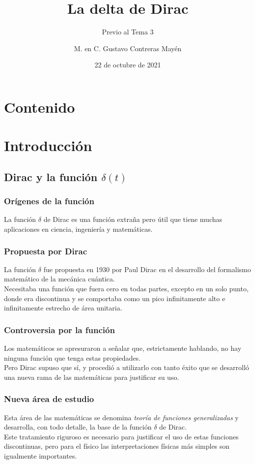 \documentclass[12pt]{beamer}
\date{22 de octubre de 2021}
\title{\large{La delta de Dirac}}
\subtitle{Previo al Tema 3}
\author{M. en C. Gustavo Contreras Mayén}
\begin{document}
\maketitle
\fontsize{14}{14}\selectfont
{}

\section*{Contenido}

\section{Introducción}
\subsection{Dirac y la función \texorpdfstring{$\delta(t)$}{d(t)}}

\begin{frame}
    \frametitle{Orígenes de la función}
La función $\delta$ de Dirac es una función extraña pero útil que tiene muchas aplicaciones en ciencia, ingeniería y matemáticas. 
\end{frame}
\begin{frame}
\frametitle{Propuesta por Dirac}
La función $\delta$ fue propuesta en 1930 por Paul Dirac en el desarrollo del formalismo matemático de la mecánica cuántica. 
\\
\bigskip
\pause
Necesitaba una función que fuera cero en todas partes, excepto en un solo punto, donde era discontinua y se comportaba como un pico infinitamente alto e infinitamente estrecho de área unitaria.
\end{frame}    
\begin{frame}
\frametitle{Controversia por la función}
Los matemáticos se apresuraron a señalar que, estrictamente hablando, no hay ninguna función que tenga estas propiedades. 
\\
\bigskip
\pause
Pero Dirac supuso que sí, y procedió a utilizarlo con tanto éxito que se desarrolló una nueva rama de las matemáticas para justificar su uso.
\end{frame}
\begin{frame}
\frametitle{Nueva área de estudio}
Esta área de las matemáticas se denomina \emph{teoría de funciones generalizadas} y desarrolla, con todo detalle, la base de la función $\delta$ de Dirac.
\\
\bigskip
\pause
Este tratamiento riguroso es necesario para justificar el uso de estas funciones discontinuas, pero para el físico las interpretaciones físicas más simples son igualmente importantes.
\end{frame}
\end{document}

